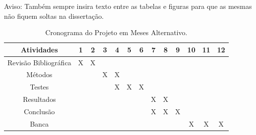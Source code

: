 \documentclass[
	12pt,				    %
	openright,			    %
	oneside,			    %
	a4paper,			    %
    sumario=tradicional,        %
	english,			    %
	brazil,				    %
 ]{abntex2}
\begin{document}
Aviso: Também sempre insira texto entre as tabelas e figuras para que as mesmas não fiquem soltas na dissertação.

\begin{table}[!ht]
    \begin{center}
    \caption{Cronograma do Projeto em Meses Alternativo.}
    \label{tab:cronograma2}
    \renewcommand{\arraystretch}{1} %
        \begin{tabular}{|c |c | c | c | c | c | c | c | c | c | c | c | c |}
            \hline
                \textbf{Atividades} & \textbf{1} & \textbf{2} & \textbf{3} & \textbf{4} & \textbf{5} & \textbf{6} & \textbf{7} & \textbf{8} & \textbf{9} & \textbf{10} & \textbf{11} & \textbf{12}\\
                \hline
                Revisão Bibliográfica & X & X & & & & & & & & & & \\
                \hline
                Métodos & & & X & X & & & & & & & & \\
                \hline
                Testes & & & & X & X & X & & & & & & \\
                \hline
                Resultados & & & & & & & X & X & & & & \\
                \hline
                Conclusão & & & & & & & X & X & X & & & \\
                \hline
                Banca & & & & & & & & & & X & X & X \\
            \hline
        \end{tabular}
    \end{center}
\end{table}


\postextual


\thispagestyle{empty}


 \thispagestyle{empty}

\end{document}
